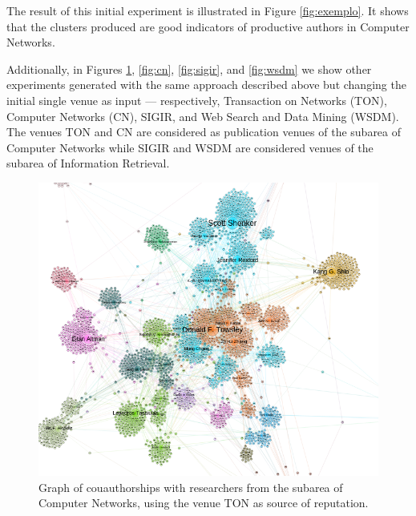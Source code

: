 \documentclass[msc]{ppgccufmg}
\begin{document}
\begin{appendices}
The result of this initial experiment is illustrated in Figure \ref{fig:exemplo}. It shows that the clusters produced are good indicators of productive authors in Computer Networks. 

Additionally, in Figures \ref{fig:ton}, \ref{fig:cn}, \ref{fig:sigir}, and \ref{fig:wsdm} we show other experiments generated with the same approach described above but changing the initial single venue as input --- respectively, Transaction on Networks (TON), Computer Networks (CN), SIGIR, and Web Search and Data Mining (WSDM). The venues TON and CN are considered as publication venues of the subarea of Computer Networks while SIGIR and WSDM are considered venues of the subarea of Information Retrieval.

\begin{figure}[h]
    \centering
    \includegraphics[scale=0.5]{fig/ton}
    \caption{Graph of couauthorships with researchers from the subarea of Computer Networks, using the venue TON as source of reputation.}
    \label{fig:ton}
\end{figure}


\end{appendices}
\end{document}
